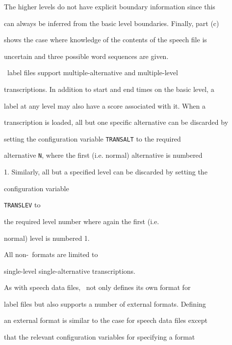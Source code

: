 The higher levels do not have explicit boundary information since this


can always be inferred from the basic level boundaries. Finally, part (c)


shows the case where knowledge of the contents of the speech file is


uncertain and three possible word sequences are given.





\HTK\ label files support multiple-alternative and multiple-level


transcriptions.  In addition to start and end times on the basic level, a


label at  any level may also have a score associated with it.  When a


transcription is loaded, all but one specific alternative can be discarded by


setting the configuration variable \texttt{TRANSALT} to the required


alternative \texttt{N}, where the first (i.e. normal) alternative is numbered


1.  Similarly, all but a specified level can be discarded by setting the


configuration variable 


\texttt{TRANSLEV} to 


the required level number where again the first (i.e.


normal) level is numbered 1.





All non-\HTK\ formats are limited to


single-level single-alternative transcriptions.













As with speech data files, \HTK\ not only defines its own format for


label files but also supports a number of external formats.  Defining


an external format is similar to the case for speech data files except


that the relevant configuration variables for specifying a format


